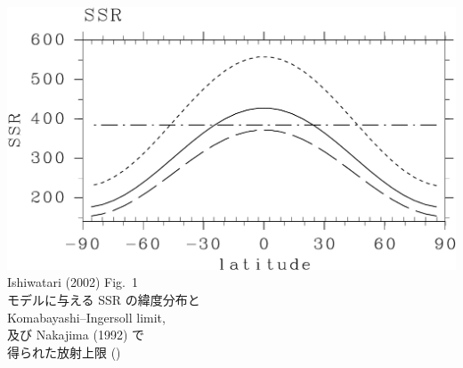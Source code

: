 \documentclass[aspectratio=149,9pt,fleqn]{beamer}
\begin{document}
\begin{frame}
\begin{columns}[T,onlytextwidth]
\begin{column}{.45\textwidth}
			\includegraphics[width=.8\textwidth]{./fig/SSR.kps-crop.pdf}\\
			Ishiwatari \etal (2002) Fig.~1\\
			モデルに与える SSR の緯度分布と\\
			Komabayashi--Ingersoll limit,\\
			及び Nakajima \etal (1992) で\\
			得られた放射上限 ()
		\end{column}
	\end{columns}
\end{frame}
\end{document}
